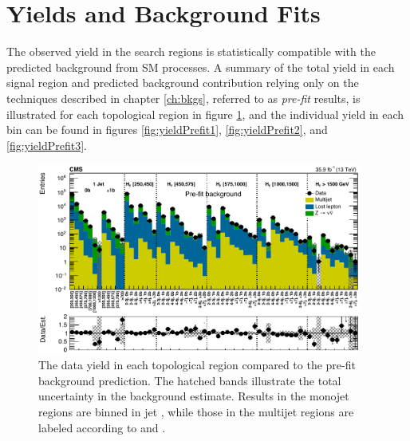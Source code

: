 \section{Yields and Background Fits}
\label{sec:yields}

The observed yield in the search regions is statistically compatible with the predicted background from SM processes. A summary of the total yield in each signal region and predicted background contribution relying only on the techniques described in chapter \ref{ch:bkgs}, referred to as {\it pre-fit} results, is illustrated for each topological region in figure \ref{fig:yieldPrefitTopological}, and the individual yield in each \mttwo bin can be found in figures \ref{fig:yieldPrefit1}, \ref{fig:yieldPrefit2}, and \ref{fig:yieldPrefit3}.
\begin{figure}
	\centering
	\includegraphics[width=0.95\textwidth]{results/figs/mt2_ALL_fullEstimate}
	\caption{The data yield in each topological region compared to the pre-fit background prediction. The hatched bands illustrate the total uncertainty in the background estimate. Results in the monojet regions are binned in jet \pt, while those in the multijet regions are labeled according to \nj and \nb.}
	\label{fig:yieldPrefitTopological}
\end{figure}
